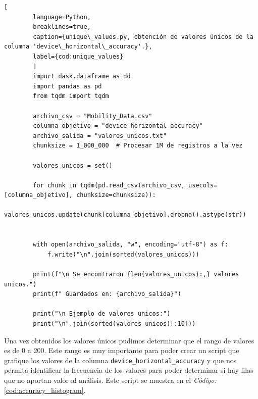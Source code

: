     \begin{lstlisting}[
        language=Python,
        breaklines=true,
        caption={unique\_values.py, obtención de valores únicos de la columna 'device\_horizontal\_accuracy'.},
        label={cod:unique_values}
        ]
        import dask.dataframe as dd
        import pandas as pd
        from tqdm import tqdm

        archivo_csv = "Mobility_Data.csv" 
        columna_objetivo = "device_horizontal_accuracy"  
        archivo_salida = "valores_unicos.txt"
        chunksize = 1_000_000  # Procesar 1M de registros a la vez

        valores_unicos = set()

        for chunk in tqdm(pd.read_csv(archivo_csv, usecols=[columna_objetivo], chunksize=chunksize)):
            valores_unicos.update(chunk[columna_objetivo].dropna().astype(str)) 

    
        with open(archivo_salida, "w", encoding="utf-8") as f:
            f.write("\n".join(sorted(valores_unicos)))  

        print(f"\n Se encontraron {len(valores_unicos):,} valores unicos.")
        print(f" Guardados en: {archivo_salida}")

        print("\n Ejemplo de valores unicos:")
        print("\n".join(sorted(valores_unicos)[:10]))
    \end{lstlisting}

\noindent Una vez obtenidos los valores únicos pudimos determinar que el rango de valores es de 0 a 200. Este rango es muy importante para poder crear un script que grafique los valores de la columna \texttt{device\_horizontal\_accuracy} y que nos permita identificar la frecuencia de los valores para poder determinar si hay filas que no aportan valor al análisis. Este script se muestra en el \textit{Código:} \ref{cod:accuracy_histogram}.

